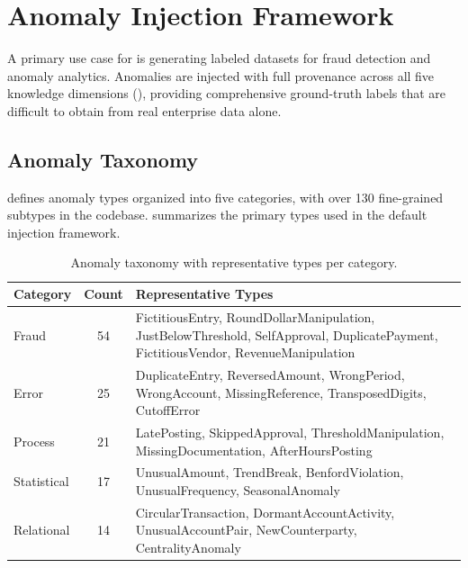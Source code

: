 \section{Anomaly Injection Framework}
\label{sec:anomaly_injection}

A primary use case for \system{} is generating labeled datasets for
fraud detection and anomaly analytics.  Anomalies are injected with
full provenance across all five knowledge dimensions
(), providing comprehensive ground-truth labels that are
difficult to obtain from real enterprise data alone.

\subsection{Anomaly Taxonomy}
\label{sec:anom_taxonomy}

\system{} defines anomaly types organized into five categories, with
over 130 fine-grained subtypes in the codebase.
 summarizes the primary types used in the
default injection framework.

\begin{table}[t]
\centering
\caption{Anomaly taxonomy with representative types per category.}
\label{tab:anomaly_types}
\small
\begin{tabular}{p{2.4cm}cp{7.5cm}}
\toprule
\textbf{Category} & \textbf{Count} & \textbf{Representative Types} \\
\midrule
Fraud & 54 & FictitiousEntry, RoundDollarManipulation,
  JustBelowThreshold, SelfApproval, DuplicatePayment,
  FictitiousVendor, RevenueManipulation \\
Error & 25 & DuplicateEntry, ReversedAmount, WrongPeriod,
  WrongAccount, MissingReference, TransposedDigits,
  CutoffError \\
Process & 21 & LatePosting, SkippedApproval,
  ThresholdManipulation, MissingDocumentation,
  AfterHoursPosting \\
Statistical & 17 & UnusualAmount, TrendBreak,
  BenfordViolation, UnusualFrequency, SeasonalAnomaly \\
Relational & 14 & CircularTransaction,
  DormantAccountActivity, UnusualAccountPair,
  NewCounterparty, CentralityAnomaly \\
\bottomrule
\end{tabular}
\end{table}

